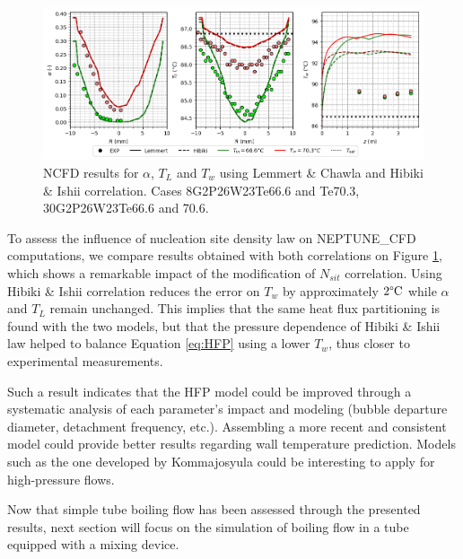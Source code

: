 %
\begin{figure}[h!]
\centering
\includegraphics[scale=0.60]{img/DEBORA/plot_HI.png}
\caption{NCFD results for $\alpha$, $T_{L}$ and $T_{w}$ using {Lemmert} \& {Chawla} and {Hibiki} \& {Ishii} correlation. Cases 8G2P26W23Te66.6 and Te70.3, 30G2P26W23Te66.6 and 70.6.}
\label{fig:NCFD_nsit}
\end{figure}
%
To assess the influence of nucleation site density law on NEPTUNE\_CFD computations, we compare results obtained with both correlations on Figure \ref{fig:NCFD_nsit}, which shows a remarkable impact of the modification of $N_{sit}$ correlation. Using {Hibiki} \& {Ishii} correlation reduces the error on $T_{w}$ by approximately $2\degree\text{C}$ while $\alpha$ and $T_{L}$ remain unchanged. This implies that the same heat flux partitioning is found with the two models, but that the pressure dependence of {Hibiki} \& {Ishii} law helped to balance Equation \ref{eq:HFP} using a lower $T_{w}$, thus closer to experimental measurements.

Such a result indicates that the HFP model could be improved through a systematic analysis of each parameter's impact and modeling (bubble departure diameter, detachment frequency, etc.). Assembling a more recent and consistent model could provide better results regarding wall temperature prediction. Models such as the one developed by {Kommajosyula}\cite {Kommajosyula2020} could be interesting to apply for high-pressure flows.


Now that simple tube boiling flow has been assessed through the presented results, next section will focus on the simulation of boiling flow in a tube equipped with a mixing device.%